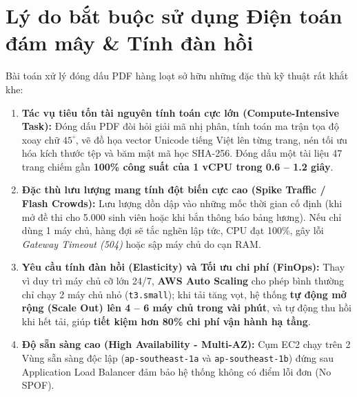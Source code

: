 \documentclass[12pt,a4paper]{report}
\begin{document}
\section{Lý do bắt buộc sử dụng Điện toán đám mây \& Tính đàn hồi}
Bài toán xử lý đóng dấu PDF hàng loạt sở hữu những đặc thù kỹ thuật rất khắt khe:
\begin{enumerate}
    \item \textbf{Tác vụ tiêu tốn tài nguyên tính toán cực lớn (Compute-Intensive Task):} Đóng dấu PDF đòi hỏi giải mã nhị phân, tính toán ma trận tọa độ xoay chữ $45^\circ$, vẽ đồ họa vector Unicode tiếng Việt lên từng trang, nén tối ưu hóa kích thước tệp và băm mật mã học SHA-256. Đóng dấu một tài liệu 47 trang chiếm gần \textbf{100\% công suất của 1 vCPU trong 0.6 -- 1.2 giây}.
    \item \textbf{Đặc thù lưu lượng mang tính đột biến cực cao (Spike Traffic / Flash Crowds):} Lưu lượng dồn dập vào những mốc thời gian cố định (khi mở đề thi cho 5.000 sinh viên hoặc khi bắn thông báo bảng lương). Nếu chỉ dùng 1 máy chủ, hàng đợi sẽ tắc nghẽn lập tức, CPU đạt 100\%, gây lỗi \textit{Gateway Timeout (504)} hoặc sập máy chủ do cạn RAM.
    \item \textbf{Yêu cầu tính đàn hồi (Elasticity) và Tối ưu chi phí (FinOps):} Thay vì duy trì máy chủ cỡ lớn 24/7, \textbf{AWS Auto Scaling} cho phép bình thường chỉ chạy 2 máy chủ nhỏ (\texttt{t3.small}); khi tải tăng vọt, hệ thống \textbf{tự động mở rộng (Scale Out) lên 4 -- 6 máy chủ trong vài phút}, và tự động thu hồi khi hết tải, giúp \textbf{tiết kiệm hơn 80\% chi phí vận hành hạ tầng}.
    \item \textbf{Độ sẵn sàng cao (High Availability - Multi-AZ):} Cụm EC2 chạy trên 2 Vùng sẵn sàng độc lập (\texttt{ap-southeast-1a} và \texttt{ap-southeast-1b}) đứng sau Application Load Balancer đảm bảo hệ thống không có điểm lỗi đơn (No SPOF).
\end{enumerate}
\end{document}
